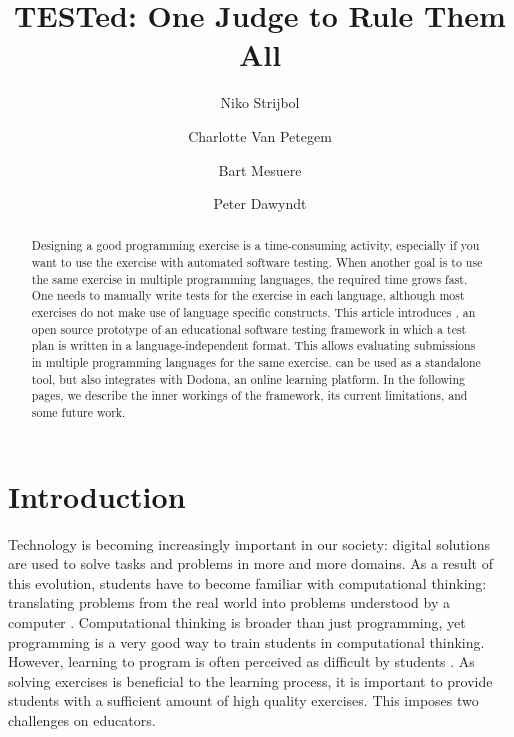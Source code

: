 \documentclass[5p,number]{elsarticle}
\title{TESTed: One Judge to Rule Them All}
\author{Niko Strijbol\fnref{fn2}}
\author{Charlotte Van Petegem\fnref{fn2}}
\author{Bart Mesuere\fnref{fn2}}
\author{Peter Dawyndt\fnref{fn2}}
\begin{document}
    \setmainfont[Ligatures=TeX,Numbers=OldStyle,Contextuals=Alternate]{Libertinus Serif}
    \setsansfont[Ligatures=TeX,Numbers=OldStyle,Contextuals=Alternate]{Libertinus Sans}
    \setmonofont[Scale=MatchLowercase,Contextuals={Alternate}]{Jetbrains Mono}

    \begin{abstract}
        Designing a good programming exercise is a time-consuming activity, especially if you want to use the exercise with automated software testing.
        When another goal is to use the same exercise in multiple programming languages, the required time grows fast.
        One needs to manually write tests for the exercise in each language, although most exercises do not make use of language specific constructs.
        This article introduces \tested{}, an open source prototype of an educational software testing framework in which a test plan is written in a language-independent format.
        This allows evaluating submissions in multiple programming languages for the same exercise.
        \tested{} can be used as a standalone tool, but also integrates with Dodona, an online learning platform.
        In the following pages, we describe the inner workings of the framework, its current limitations, and some future work.
    \end{abstract}

    \maketitle

    \section{Introduction}\label{sec:introduction}

    \noindent
    Technology is becoming increasingly important in our society: digital solutions are used to solve tasks and problems in more and more domains.
    As a result of this evolution, students have to become familiar with computational thinking: translating problems from the real world into problems understood by a computer \cite{bastiaensen2017}.
    Computational thinking is broader than just programming, yet programming is a very good way to train students in computational thinking.
    However, learning to program is often perceived as difficult by students \cite{10.1145/3293881.3295779}.
    As solving exercises is beneficial to the learning process, it is important to provide students with a sufficient amount of high quality exercises.
    This imposes two challenges on educators.
    
\end{document}
